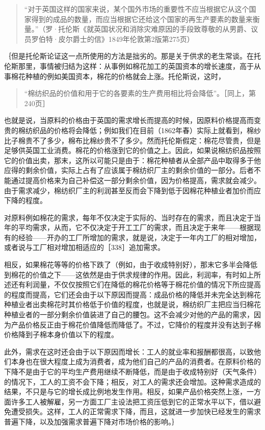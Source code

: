 \begin{quote}{“对于英国这样的国家来说，某个国外市场的重要性不应当根据它从这个国家得到的成品的数量，而应当根据它还给这个国家的再生产要素的数量来衡量。”（罗·托伦斯《就英国状况和消除灾难原因的手段致尊敬的从男爵、议员罗伯特·皮尔爵士的信》1849年伦敦第2版第275页）}\end{quote}

｛但是托伦斯论证这一点所使用的方法是拙劣的。那是关于供求的老生常谈。在托伦斯那里，事情被归结为这样：从事例如棉花加工的英国资本的增长速度，高于从事棉花种植的例如美国资本，棉花的价格就会上涨。托伦斯说，这时，

\begin{quote}{“棉纺织品的价值和用于它的各要素的生产费用相比将会降低”。［同上，第240页］}\end{quote}

也就是说，当原料的价格由于英国的需求增长而提高的时候，因原料价格提高而变贵的棉纺织品的价格将会降低；例如我们在目前（1862年春）实际上就看到，棉纱比子棉贵不了多少，棉布比棉纱贵不了多少。然而托伦斯假定：棉花尽管贵，但是足够供英国工业消费。棉花的价格涨到它的价值之上。因此，如果说棉纺织品按照它的价值出卖，那末，这所以可能只是由于：棉花种植者从全部产品中取得多于他应得的剩余价值，实际上占有了应该属于棉纺织厂主的剩余价值的一部分。后者不能通过提高价格来为自己补偿这一部分剩余价值，因为价格提高，需求就会减少。由于需求减少，棉纺织厂主的利润甚至反而会下降到低于因棉花种植业者加价而应下降的程度。

对原料例如棉花的需求，每年不仅决定于实际的、当时存在的需求，而且决定于当年的平均需求，从而，它不仅决定于开工工厂的需求，而且决定于来年——根据现有的经验——开办的工厂所增加的需求，就是说，决定于一年内工厂的相对增加，或者说与工厂相对增加相适应的［338］追加需求。

相反，如果棉花等等的价格下跌了（例如，由于收成特别好），那末它多半会降低到棉花的价值之下——这依然是由于供求规律的作用。因此，利润率，有时如上所述还有利润量，不仅仅按照它们在降低的棉花价格等于棉花价值的情况下所应提高的程度而提高，它们还会由于以下原因而提高：成品价格的降低并未完全达到棉花种植业者出卖棉花时其价格低于价值的程度，也就是说，棉纺织厂主把应当归棉花种植业者的一部分剩余价值装进了自己的腰包。这不会减少对他的产品的需求，因为产品价格反正由于棉花价值降低而降低了。不过，它降价的程度并没有达到子棉价格降到子棉本身价值以下的程度。

此外，需求在这时还会由于以下原因而增长：工人的就业率和报酬都很高，以致他们本身也在很大程度上成为消费者，成为他们自己的产品的消费者。在原料价格的下降不是由于它的平均生产费用继续不断降低，而是由于收成特别好（天气条件）的情况下，工人的工资不会下降；相反，对工人的需求还会增加。这种需求造成的结果，不只是与它的增长成比例地发生作用。相反，如果产品价格突然上涨，一方面许多工人被解雇，另一方面工厂主设法把工资压低到它的正常水平以下，借以避免遭受损失。这样，工人的正常需求下降，而且，这就进一步加快已经发生的需求普遍下降，以及加强需求普遍下降对市场价格的影响。｝

